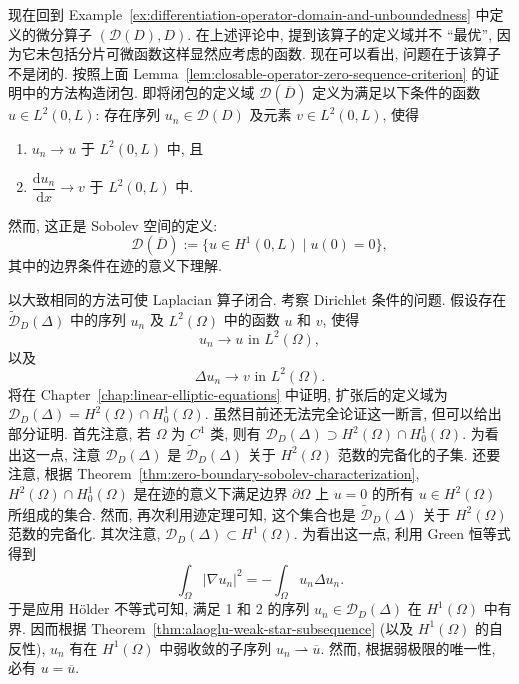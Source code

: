 \begin{Example}
\label{ex:differentiation-operator-closure-sobolev}
现在回到 Example~\ref{ex:differentiation-operator-domain-and-unboundedness} 中定义的微分算子 $(\mathcal{D}(D),D)$. 在上述评论中, 提到该算子的定义域并不 ``最优'', 因为它未包括分片可微函数这样显然应考虑的函数. 现在可以看出, 问题在于该算子不是闭的. 按照上面 Lemma~\ref{lem:closable-operator-zero-sequence-criterion} 的证明中的方法构造闭包. 即将闭包的定义域 $\mathcal{D}(\overline D)$ 定义为满足以下条件的函数 $u\in L^2(0,L)$: 存在序列 $u_n\in\mathcal{D}(D)$ 及元素 $v\in L^2(0,L)$, 使得\begin{enumerate}\item $u_n\to u$ 于 $L^2(0,L)$ 中, 且\item $\dfrac{\mathrm{d}u_n}{\mathrm{d}x}\to v$ 于 $L^2(0,L)$ 中.\end{enumerate}然而, 这正是 Sobolev 空间的定义:\[\mathcal{D}(\overline D):=\{u\in H^1(0,L)\mid u(0)=0\},\]其中的边界条件在迹的意义下理解.
\end{Example}

\begin{Example}
\label{ex:laplacian-dirichlet-closure-partial-proof}
以大致相同的方法可使 Laplacian 算子闭合. 考察 Dirichlet 条件的问题. 假设存在 $\widetilde{\mathcal{D}}_D(\Delta)$ 中的序列 $u_n$ 及 $L^2(\Omega)$ 中的函数 $u$ 和 $v$, 使得
\begin{equation}\label{eq:laplacian-closure-function-convergence}
u_n\to u\text{ in }L^2(\Omega),
\end{equation}
以及
\begin{equation}\label{eq:laplacian-closure-image-convergence}
\Delta u_n\to v\text{ in }L^2(\Omega).
\end{equation}
将在 Chapter~\ref{chap:linear-elliptic-equations} 中证明, 扩张后的定义域为 $\mathcal{D}_D(\Delta)=H^2(\Omega)\cap H_0^1(\Omega)$. 虽然目前还无法完全论证这一断言, 但可以给出部分证明. 首先注意, 若 $\Omega$ 为 $C^1$ 类, 则有 $\mathcal{D}_D(\Delta)\supset H^2(\Omega)\cap H_0^1(\Omega)$. 为看出这一点, 注意 $\mathcal{D}_D(\Delta)$ 是 $\widetilde{\mathcal{D}}_D(\Delta)$ 关于 $H^2(\Omega)$ 范数的完备化的子集. 还要注意, 根据 Theorem~\ref{thm:zero-boundary-sobolev-characterization}, $H^2(\Omega)\cap H_0^1(\Omega)$ 是在迹的意义下满足边界 $\partial\Omega$ 上 $u=0$ 的所有 $u\in H^2(\Omega)$ 所组成的集合. 然而, 再次利用迹定理可知, 这个集合也是 $\widetilde{\mathcal{D}}_D(\Delta)$ 关于 $H^2(\Omega)$ 范数的完备化. 其次注意, $\mathcal{D}_D(\Delta)\subset H^1(\Omega)$. 为看出这一点, 利用 Green 恒等式得到
\begin{equation}\label{eq:laplacian-closure-green-energy-identity}
\int_\Omega|\nabla u_n|^2=-\int_\Omega u_n\Delta u_n.
\end{equation}
于是应用 Hölder 不等式可知, 满足 1 和 2 的序列 $u_n\in\mathcal{D}_D(\Delta)$ 在 $H^1(\Omega)$ 中有界. 因而根据 Theorem~\ref{thm:alaoglu-weak-star-subsequence} (以及 $H^1(\Omega)$ 的自反性), $u_n$ 有在 $H^1(\Omega)$ 中弱收敛的子序列 $u_n\rightharpoonup\overline u$. 然而, 根据弱极限的唯一性, 必有 $u=\overline u$.
\end{Example}

